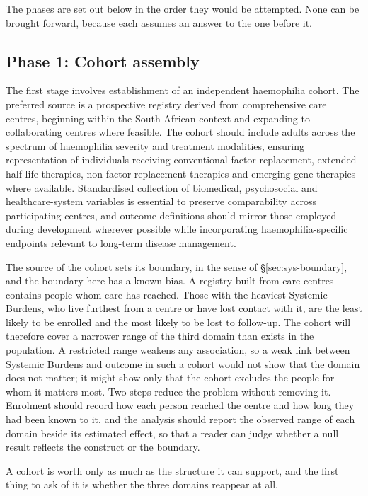 The phases are set out below in the order they would be attempted. None can be
brought forward, because each assumes an answer to the one before it.

\subsection{Phase 1: Cohort assembly}

The first stage involves establishment of an independent haemophilia cohort. The preferred source is a prospective registry derived from comprehensive care centres, beginning within the South African context and expanding to collaborating centres where feasible. The cohort should include adults across the spectrum of haemophilia severity and treatment modalities, ensuring representation of individuals receiving conventional factor replacement, extended half-life therapies, non-factor replacement therapies and emerging gene therapies where available. Standardised collection of biomedical, psychosocial and healthcare-system variables is essential to preserve comparability across participating centres, and outcome definitions should mirror those employed during development wherever possible while incorporating haemophilia-specific endpoints relevant to long-term disease management.

The source of the cohort sets its boundary, in the sense of \S\ref{sec:sys-boundary}, and the boundary here has a known bias. A registry built from care centres contains people whom care has reached. Those with the heaviest Systemic Burdens, who live furthest from a centre or have lost contact with it, are the least likely to be enrolled and the most likely to be lost to follow-up. The cohort will therefore cover a narrower range of the third domain than exists in the population. A restricted range weakens any association, so a weak link between Systemic Burdens and outcome in such a cohort would not show that the domain does not matter; it might show only that the cohort excludes the people for whom it matters most. Two steps reduce the problem without removing it. Enrolment should record how each person reached the centre and how long they had been known to it, and the analysis should report the observed range of each domain beside its estimated effect, so that a reader can judge whether a null result reflects the construct or the boundary.

A cohort is worth only as much as the structure it can support, and the
first thing to ask of it is whether the three domains reappear at all.

